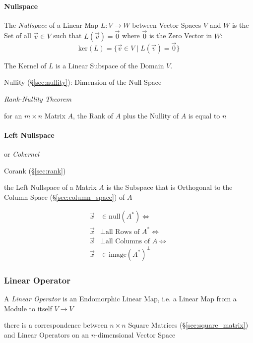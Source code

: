 \paragraph{Nullspace}\label{sec:nullspace}\hfill

The \emph{Nullspace} of a Linear Map $L : V \rightarrow W$ between Vector
Spaces $V$ and $W$ is the Set of all $\vec{v}\in{V}$ such that $L(\vec{v}) =
\vec{0}$ where $\vec{0}$ is the Zero Vector in $W$:
\[
  \text{ker}(L) = \{\vec{v}\in{V} \;|\; L(\vec{v}) = \vec{0}\}
\]

The Kernel of $L$ is a Linear Subspace of the Domain $V$.

Nullity (\S\ref{sec:nullity}): Dimension of the Null Space

\emph{Rank-Nullity Theorem}

for an $m \times n$ Matrix $A$, the Rank of $A$ plus the Nullity
of $A$ is equal to $n$



\paragraph{Left Nullspace}\label{sec:left_nullspace}\hfill

or \emph{Cokernel}

Corank (\S\ref{sec:rank})

the Left Nullspace of a Matrix $A$ is the Subspace that is Orthogonal to the
Column Space (\S\ref{sec:column_space}) of $A$

\begin{align*}
  \vec{x} & \in \mathrm{null}(A^*) \Leftrightarrow         \\
  \vec{x} & \bot \text{all Rows of }A^* \Leftrightarrow    \\
  \vec{x} & \bot \text{all Columns of }A \Leftrightarrow   \\
  \vec{x} & \in \mathrm{image}(A^*)^\bot
\end{align*}



\subsubsection{Linear Operator}\label{sec:linear_operator}

A \emph{Linear Operator} is an Endomorphic Linear Map, i.e. a Linear
Map from a Module to itself $V \rightarrow V$

there is a correspondence between $n\times{n}$ Square Matrices
(\S\ref{sec:square_matrix}) and Linear Operators on an $n$-dimensional Vector
Space

